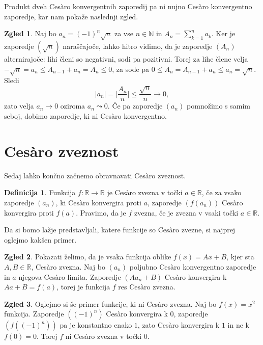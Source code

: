 \documentclass[a4paper,12pt]{article}
\def\N{\mathbb{N}}
\theoremstyle{definition}
\newtheorem{definicija}{Definicija}
\newtheorem{zgled}{Zgled}
\theoremstyle{plain}
\begin{document}
Produkt dveh Ces\`{a}ro konvergentnih zaporedij pa ni nujno Ces\`{a}ro konvergentno zaporedje, kar nam pokaže naslednji zgled.
\begin{zgled}
    Naj bo $a_n = (-1)^n \sqrt{n}$ za vse $n \in \N$ in $A_n = \sum_{k=1}^{n}a_k$. Ker je zaporedje $(\sqrt{n})$ naraščajoče, lahko hitro vidimo, da je zaporedje $(A_n)$ alternirajoče: lihi členi so negativni, sodi pa pozitivni. Torej za lihe člene velja $-\sqrt{n} = a_n \leq A_{n-1} + a_n = A_n \leq 0$, za sode pa $0 \leq A_n = A_{n-1} + a_n \leq a_n = \sqrt{n}$. Sledi 
    $$\lvert \overline{a}_n \rvert = \lvert \frac{A_n}{n} \rvert \leq \frac{\sqrt{n}}{n} \rightarrow 0,$$
    zato velja $a_n \rightarrow 0$ oziroma $a_n \leadsto 0$. Če pa zaporedje $(a_n)$ pomnožimo s samim seboj, dobimo zaporedje, ki ni Ces\`{a}ro konvergentno.
\end{zgled}




\section{Ces\`{a}ro zveznost}
Sedaj lahko končno začnemo obravnavati Ces\`{a}ro zveznost.

\begin{definicija}
    Funkcija $f: \mathbb{R} \rightarrow \mathbb{R}$ je Ces\`{a}ro zvezna v točki $a \in \mathbb{R}$, če za vsako zaporedje $(a_n)$, ki Ces\`{a}ro konvergira proti $a$, zaporedje $(f(a_n))$ Ces\`{a}ro konvergira proti $f(a)$. Pravimo, da je $f$ zvezna, če je zvezna v vsaki točki $a \in \mathbb{R}$.
\end{definicija}

Da si bomo lažje predstavljali, katere funkcije so Ces\`{a}ro zvezne, si najprej oglejmo kakšen primer.

\begin{zgled}
    \label{vsezvez}
    Pokazati želimo, da je vsaka funkcija oblike $f(x) = Ax + B$, kjer sta $A, B \in \mathbb{R}$, Ces\`{a}ro zvezna. Naj bo $(a_n)$ poljubno Ces\`{a}ro konvergentno zaporedje in $a$ njegova Ces\`{a}ro limita. Zaporedje $(A a_n + B)$ Ces\`{a}ro konvergira k $A a + B = f(a)$, torej je funkcija $f$ res Ces\`{a}ro zvezna.
\end{zgled}

\begin{zgled}
    Oglejmo si še primer funkcije, ki ni Ces\`{a}ro zvezna. Naj bo $f(x) = x^2$ funkcija. Zaporedje $((-1)^n)$ Ces\`{a}ro konvergira k $0$, zaporedje $(f((-1)^n))$ pa je konstantno enako $1$, zato Ces\`{a}ro konvergira k $1$ in ne k $f(0) = 0$. Torej $f$ ni Ces\`{a}ro zvezna v točki $0$.
\end{zgled}
\end{document}
